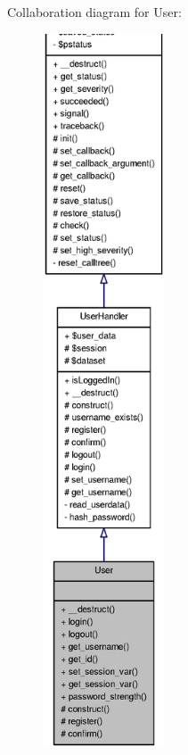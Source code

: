 Collaboration diagram for User:\nopagebreak
\begin{figure}[H]
\begin{center}
\leavevmode
\includegraphics[height=600pt]{classUser__coll__graph}
\end{center}
\end{figure}
